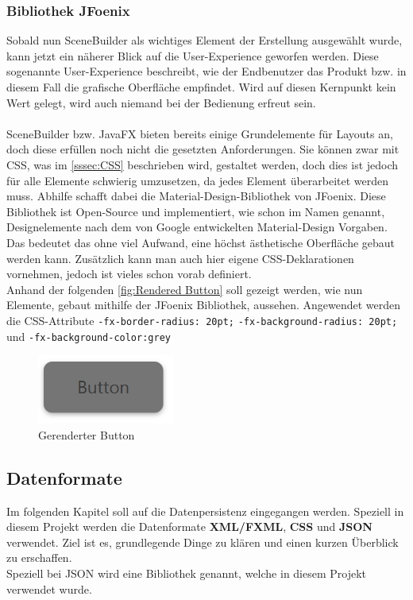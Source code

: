\subsubsection{Bibliothek JFoenix}
Sobald nun SceneBuilder als wichtiges Element der Erstellung ausgewählt wurde, kann jetzt ein näherer Blick auf die User-Experience geworfen werden.
Diese sogenannte User-Experience beschreibt, wie der Endbenutzer das Produkt bzw. in diesem Fall die grafische Oberfläche empfindet.
Wird auf diesen Kernpunkt kein Wert gelegt, wird auch niemand bei der Bedienung erfreut sein.\\\\
SceneBuilder bzw. JavaFX bieten bereits einige Grundelemente für Layouts an, doch diese erfüllen noch nicht die gesetzten Anforderungen.
Sie können zwar mit CSS, was im \autoref{sssec:CSS} beschrieben wird, gestaltet werden, doch dies ist jedoch für alle Elemente schwierig umzusetzen, da jedes Element überarbeitet werden muss.
Abhilfe schafft dabei die Material-Design-Bibliothek von JFoenix.
Diese Bibliothek ist Open-Source und implementiert, wie schon im Namen genannt, Designelemente nach dem von Google entwickelten Material-Design Vorgaben.
Das bedeutet das ohne viel Aufwand, eine höchst ästhetische Oberfläche gebaut werden kann.
Zusätzlich kann man auch hier eigene CSS-Deklarationen vornehmen, jedoch ist vieles schon vorab definiert.\\
Anhand der folgenden \autoref{fig:Rendered Button} soll gezeigt werden, wie nun Elemente, gebaut mithilfe der JFoenix Bibliothek, aussehen.
Angewendet werden die CSS-Attribute \lstinline{-fx-border-radius: 20pt;}  \lstinline{-fx-background-radius: 20pt;} und \lstinline{-fx-background-color:grey}
\begin{figure}[H]
    \centering
    \includegraphics[width=0.4\textwidth]{fig/ainf/RenderedButton.PNG}
    \caption{Gerenderter Button}
    \label{fig:Rendered Button}
\end{figure}
\subsection{Datenformate}\label{subsec:datenformate-in-java-fx}
Im folgenden Kapitel soll auf die Datenpersistenz eingegangen werden.
Speziell in diesem Projekt werden die Datenformate \textbf{XML/FXML}, \textbf{CSS} und \textbf{JSON} verwendet.
Ziel ist es, grundlegende Dinge zu klären und einen kurzen Überblick zu erschaffen.\\
Speziell bei JSON wird eine Bibliothek genannt, welche in diesem Projekt verwendet wurde.
